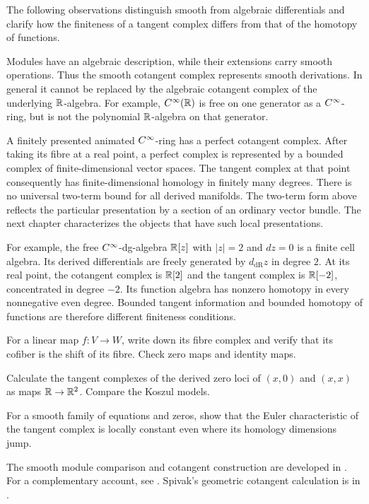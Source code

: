 The following observations distinguish smooth from algebraic
differentials and clarify how the finiteness of a tangent complex
differs from that of the homotopy of functions.

Modules have an algebraic description, while their extensions carry
smooth operations. Thus the smooth cotangent complex represents
smooth derivations. In general it cannot be replaced by the algebraic
cotangent complex of the underlying $\mathbb{R}$-algebra.
For example, $C^\infty(\mathbb{R})$ is free on one generator as a $C^\infty$-ring,
but is not the polynomial $\mathbb{R}$-algebra on that generator.

A finitely presented animated $C^\infty$-ring has a perfect cotangent complex.
After taking its fibre at a real point, a perfect complex is represented
by a bounded complex of finite-dimensional vector spaces. The tangent
complex at that point consequently has
finite-dimensional homology in finitely many degrees.
There is no universal two-term bound for all derived manifolds.
The two-term form above reflects the particular presentation by a
section of an ordinary vector bundle. The next chapter characterizes
the objects that have such local presentations.

For example, the free $C^\infty$-dg-algebra $\mathbb{R}[z]$ with $|z|=2$ and
$dz=0$ is a finite cell algebra. Its derived differentials are freely
generated by $d_{\mathrm{dR}}z$ in degree $2$. At its real point,
the cotangent complex is $\mathbb{R}[2]$ and the tangent complex is $\mathbb{R}[-2]$,
concentrated in degree $-2$. Its function algebra has nonzero homotopy
in every nonnegative even degree. Bounded tangent information and
bounded homotopy of functions are therefore different finiteness conditions.

\begin{exercise}
For a linear map $f\colon V\to W$, write down its fibre complex and
verify that its cofiber is the shift of its fibre. Check zero maps
and identity maps.
\end{exercise}

\begin{exercise}
Calculate the tangent complexes of the derived zero loci of $(x,0)$
and $(x,x)$ as maps $\mathbb{R}\to\mathbb{R}^2$. Compare the Koszul models.
\end{exercise}

\begin{exercise}
For a smooth family of equations and zeros, show that the Euler
characteristic of the tangent complex is locally constant even where
its homology dimensions jump.
\end{exercise}

The smooth module comparison and cotangent construction are developed in
\cite[Section~4.3 and Construction~5.1.0.1, Definition~5.1.0.2,
Remark~5.1.0.4]{Steffens_Derived_Differential_Geometry}.
For a complementary account, see
\cite[Sections~3.2--3.3 and Appendix~D.3]
{Pascarella_Cotangent_Complex_Derived_Differential_Geometry}.
Spivak's geometric cotangent calculation is in
\cite[Section~7]{Spivak_Derived_Smooth_Manifolds}.
